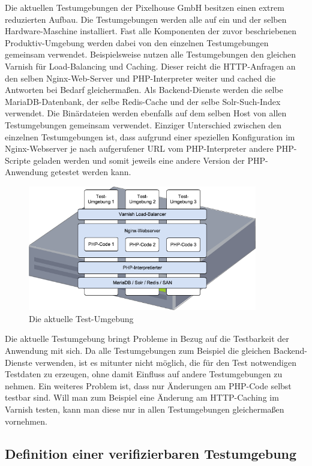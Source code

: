 Die aktuellen Testumgebungen der Pixelhouse GmbH besitzen einen extrem reduzierten Aufbau. Die Testumgebungen werden alle auf ein und der selben Hardware-Maschine installiert. Fast alle Komponenten der zuvor beschriebenen Produktiv-Umgebung werden dabei von den einzelnen Testumgebungen gemeinsam verwendet. Beispielsweise nutzen alle Testumgebungen den gleichen Varnish für Load-Balancing und Caching. Dieser reicht die HTTP-Anfragen an den selben Nginx-Web-Server und PHP-Interpreter weiter und cached die Antworten bei Bedarf gleichermaßen. Als Backend-Dienste werden die selbe MariaDB-Datenbank, der selbe Redis-Cache und der selbe Solr-Such-Index verwendet. Die Binärdateien werden ebenfalls auf dem selben Host von allen Testumgebungen gemeinsam verwendet. Einziger Unterschied zwischen den einzelnen Testumgebungen ist, dass aufgrund einer speziellen Konfiguration im Nginx-Webserver je nach aufgerufener URL vom PHP-Interpreter andere PHP-Scripte geladen werden und somit jeweils eine andere Version der PHP-Anwendung getestet werden kann.

\begin{figure}[!ht]
  \begin{center}
    \includegraphics[width=10cm]{bilder/Aktuelle-Testumgebung.png}
    \caption{Die aktuelle Test-Umgebung}
  \end{center}
\end{figure}

Die aktuelle Testumgebung bringt Probleme in Bezug auf die Testbarkeit der Anwendung mit sich. Da alle Testumgebungen zum Beispiel die gleichen Backend-Dienste verwenden, ist es mitunter nicht möglich, die für den Test notwendigen Testdaten zu erzeugen, ohne damit Einfluss auf andere Testumgebungen zu nehmen. Ein weiteres Problem ist, dass nur Änderungen am PHP-Code selbst testbar sind. Will man zum Beispiel eine Änderung am HTTP-Caching im Varnish testen, kann man diese nur in allen Testumgebungen gleichermaßen vornehmen.

\subsection{Definition einer verifizierbaren Testumgebung}


